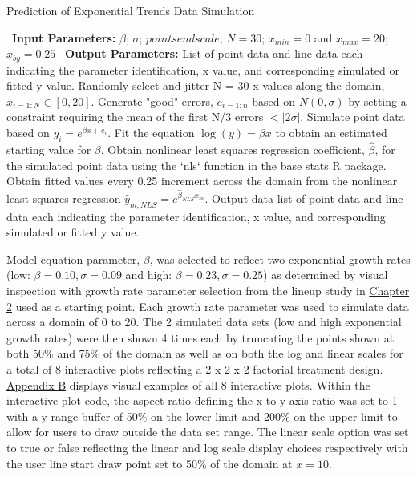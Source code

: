 \documentclass[print]{nuthesis}
\begin{document}
\begin{algorithm}
  \caption{Prediction of Exponential Trends Data Simulation}\label{exponential-prediction-algorithm}
  \begin{algorithmic}[1]
    \Statex \textbullet~\textbf{Input Parameters:} $\beta$; $\sigma$; $pointsendscale$; $N = 30$; $x_{min} = 0$ and $x_{max} = 20$; $x_{by} = 0.25$
    \Statex \textbullet~\textbf{Output Parameters:} List of point data and line data each indicating the parameter identification, x value, and corresponding simulated or fitted y value.
    \State Randomly select and jitter N = 30 x-values along the domain, $x_{i=1:N}\in [0, 20]$.
    \State Generate "good" errors, $e_{i = 1:n}$ based on $N(0,\sigma)$ by setting a constraint requiring the mean of the first N/3 errors $< |2\sigma|.$
    \State Simulate point data based on $y_i = e^{\beta x + e_i}$.
    \State Fit the equation $\log(y) = \beta x$ to obtain an estimated starting value for $\beta$. 
    \State Obtain nonlinear least squares regression coefficient, $\hat\beta$, for the simulated point data using the `nls` function in the base stats R package.
    \State Obtain fitted values every 0.25 increment across the domain from the nonlinear least squares regression $\hat y_{m,NLS} = e^{\hat\beta_{NLS} x_m}$.
    \State Output data list of point data and line data each indicating the parameter identification, x value, and corresponding simulated or fitted y value.
  \end{algorithmic}
\end{algorithm}

Model equation parameter, \(\beta\), was selected to reflect two exponential growth rates (low: \(\beta = 0.10, \sigma = 0.09\) and high: \(\beta = 0.23, \sigma = 0.25\)) as determined by visual inspection with growth rate parameter selection from the lineup study in \protect\hyperlink{lineups-parameter-selection}{Chapter 2} used as a starting point.
Each growth rate parameter was used to simulate data across a domain of 0 to 20.
The 2 simulated data sets (low and high exponential growth rates) were then shown 4 times each by truncating the points shown at both 50\% and 75\% of the domain as well as on both the log and linear scales for a total of 8 interactive plots reflecting a 2 x 2 x 2 factorial treatment design.
\protect\hyperlink{exponential-prediction-plots}{Appendix B} displays visual examples of all 8 interactive plots.
Within the interactive plot code, the aspect ratio defining the x to y axis ratio was set to 1 with a y range buffer of 50\% on the lower limit and 200\% on the upper limit to allow for users to draw outside the data set range.
The linear scale option was set to true or false reflecting the linear and log scale display choices respectively with the user line start draw point set to 50\% of the domain at \(x = 10\).
\end{document}
